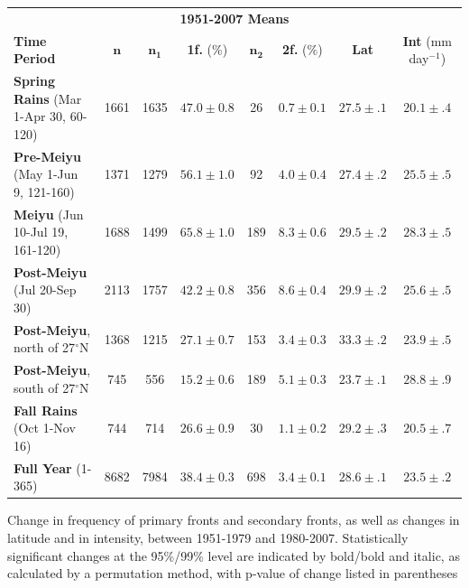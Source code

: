 \documentclass[draft,grl]{agutexSI}
\begin{document}
\begin{article}
\begin{table}
\begin{tabular}{ l c c c c c c c}
	 \multicolumn{8}{c}{\textbf{1951-2007 Means}} \\
	 \textbf{Time Period} & $\boldsymbol{n}$ & $\boldsymbol{n_1}$ & \textbf{1f.} (\%) & $\boldsymbol{n_2}$ & \textbf{2f.} (\%) & \textbf{Lat} & \textbf{Int} (mm day$^{-1}$) \\
	 \hline
	\textbf{Spring Rains} (Mar 1-Apr 30, 60-120) & 1661 & 1635 & $47.0 \pm 0.8$ & 26 & $0.7 \pm 0.1$ & $27.5 \pm .1$ & $20.1 \pm .4$ \\
	\textbf{Pre-Meiyu} (May 1-Jun 9, 121-160) & 1371 & 1279 & $56.1 \pm 1.0$ & 92 & $4.0 \pm 0.4$ & $27.4 \pm .2$ & $25.5 \pm .5$ \\
	\textbf{Meiyu} (Jun 10-Jul 19, 161-120) & 1688 & 1499 &$65.8 \pm 1.0$ & 189 & $8.3 \pm 0.6$ & $29.5 \pm .2$ & $28.3 \pm .5$ \\
	\textbf{Post-Meiyu} (Jul 20-Sep 30) & 2113 & 1757 & $42.2 \pm 0.8 $ & 356 & $8.6 \pm 0.4$ & $29.9 \pm .2$ & $25.6 \pm .5$ \\
	\textbf{Post-Meiyu}, north of 27$^\circ$N & 1368 & 1215 & $27.1 \pm 0.7 $ & 153 & $3.4 \pm 0.3$ & $33.3 \pm .2$ & $23.9 \pm .5$ \\
	\textbf{Post-Meiyu}, south of 27$^\circ$N & 745 & 556 & $15.2 \pm 0.6 $ & 189 & $5.1 \pm 0.3$ & $23.7 \pm .1$ & $28.8 \pm .9$ \\
	\textbf{Fall Rains} (Oct 1-Nov 16) & 744 & 714 & $26.6 \pm 0.9 $ & 30 & $1.1 \pm 0.2$ & $29.2 \pm .3$ & $20.5 \pm .7$ \\
	\textbf{Full Year} (1-365) & 8682 & 7984 & $38.4 \pm 0.3$ & 698 & $3.4 \pm 0.1$ & $28.6 \pm .1$ & $23.5 \pm .2$ \\
\end{tabular}
\end{table}

\begin{table}

\caption{Change in frequency of primary fronts and secondary fronts, as well as changes in latitude and in intensity, between 1951-1979 and 1980-2007. Statistically significant changes at the 95\%/99\% level are indicated by bold/bold and italic, as calculated by a permutation method, with p-value of change listed in parentheses}


\end{table}
\end{article}
\end{document}
